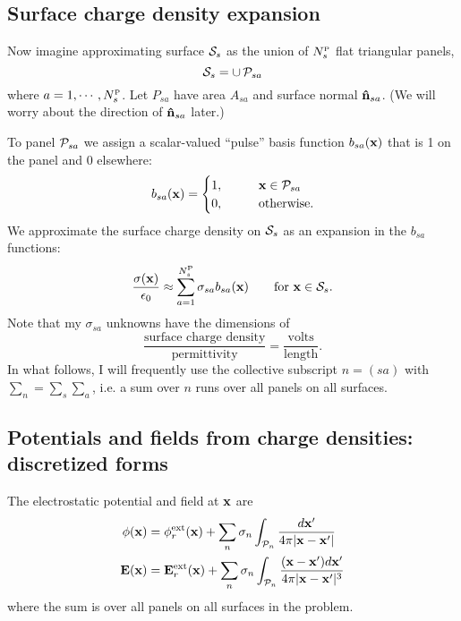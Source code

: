 \documentclass[letterpaper]{article}
\begin{document}
\subsection*{Surface charge density expansion}

Now imagine approximating surface $\mathcal{S}_s$ as the union
of $N_s^{\hbox{\tiny{P}}}$ flat triangular panels, 
$$ \mathcal{S}_{s} = \cup \, \mathcal{P}_{sa}$$
where $a=1,\cdots,N_s^{\hbox{\tiny{P}}}$.
Let $P_{sa}$ have area $A_{sa}$ and surface normal
$\mathbf{\hat n}_{sa}$. (We will worry about the direction
of $\mathbf{\hat n}_{sa}$ later.)

To panel $\mathcal{P}_{sa}$ we assign a scalar-valued 
``pulse'' basis function $b_{sa}(\mathbf{x})$ that is 
1 on the panel and 0 elsewhere:
$$ b_{sa}(\mathbf{x}) = 
   \begin{cases}
    1, \qquad &\mathbf{x} \in \mathcal{P}_{sa} \\
    0, \qquad &\text{otherwise}.
  \end{cases}
$$
We approximate the surface charge density on $\mathcal{S}_s$
as an expansion in the $b_{sa}$ functions:
$$ \frac{\sigma(\mathbf{x})}{\epsilon_0} 
   \approx \sum_{a=1}^{N_s^{\hbox{\tiny{P}}}} \sigma_{sa} b_{sa}(\mathbf{x})
   \qquad 
   \text{for }\mathbf{x}\in \mathcal{S}_s.
$$
Note that my $\sigma_{sa}$ unknowns have the dimensions
of 
$$\frac{\text{surface charge density}}{\text{permittivity}}=
  \frac{\text{volts}}{\text{length}}.
$$
In what follows, I will frequently use the collective
subscript $n=(sa)$ with $\sum_n=\sum_s \sum_a$, i.e.
a sum over $n$ runs over all panels on all surfaces.

\subsection*{Potentials and fields from charge densities: 
             discretized forms} 

The electrostatic potential and field at $\mathbf{x}$ are 
\begin{subequations}
\begin{align}
\phi(\mathbf{x}) 
&= \phi_r^{\hbox{\scriptsize{ext}}}(\mathbf{x})
   +
   \sum_{n} \sigma_n 
   \int_{\mathcal{P}_n} \frac{d\mathbf{x}^\prime}{4\pi |\mathbf{x} - \mathbf{x}^\prime|}
\\
\mathbf{E}(\mathbf{x}) 
&= \mathbf{E}_r^{\hbox{\scriptsize{ext}}}(\mathbf{x})
   +
   \sum_{n} \sigma_n 
   \int_{\mathcal{P}_n} \frac{(\mathbf{x}-\mathbf{x}^\prime)d\mathbf{x}^\prime}
                       {4\pi |\mathbf{x} - \mathbf{x}^\prime|^3}
\end{align}
\label{DiscreteEquations1}
\end{subequations}
where the sum is over all panels on all surfaces in the problem.
\end{document}
